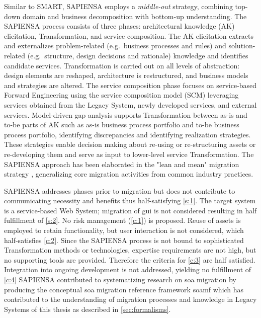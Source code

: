 Similar to SMART, SAPIENSA employs a \emph{middle-out} strategy, combining top-down domain and business decomposition with bottom-up  understanding.
The SAPIENSA process consists of three phases: architectural knowledge (AK) elicitation, \gls{Transformation}, and service composition.
The AK elicitation extracts and externalizes problem-related (e.g.~business processes and rules) and solution-related (e.g.~structure, design decisions and rationale) knowledge and identifies candidate services.
\gls{Transformation} is carried out on all levels of abstraction: design elements are reshaped, architecture is restructured, and business models and strategies are altered.
The service composition phase focuses on service-based \gls{Forward Engineering} using the service composition model (SCM) leveraging services obtained from the \gls{Legacy System}, newly developed services, and external services.
Model-driven gap analysis \autocite{Nguyen2009} supports \gls{Transformation} between as-is and to-be parts of AK such as as-is business process portfolio and to-be business process portfolio, identifying discrepancies and identifying realization strategies.
These strategies enable decision making about re-using or re-structuring  assets or re-developing them and serve as input to lower-level service \gls{Transformation}.
The SAPIENSA approach has been elaborated in the "lean and mean" migration strategy \autocite{Razavian2012,Razavian2014a}, generalizing core migration activities from common industry practices.

SAPIENSA addresses phases prior to migration but does not contribute to communicating necessity and benefits thus half-satisfying \cref{s:1}.
The \gls{target system} is a service-based \gls{Web System}; migration of \gls{gui} is not considered resulting in half fulfillment of \cref{s:2}.
No \gls{risk management} (\cref{c:1}) is proposed.
Reuse of  assets is employed to retain functionality, but user interaction is not considered, which half-satisfies \cref{c:2}.
Since the SAPIENSA process is not bound to sophisticated \gls{Transformation} methods or technologies, expertise requirements are not high, but no supporting tools are provided.
Therefore the criteria for \cref{c:3} are half satisfied.
Integration into ongoing development is not addressed, yielding no fulfillment of \cref{c:4}
SAPIENSA contributed to systematizing research on \gls{soa} migration by producing the conceptual \gls{soa} migration reference framework \gls{soamf} which has contributed to the understanding of migration processes and knowledge in \glspl{Legacy System} of this thesis as described in \cref{sec:formalisms}.

